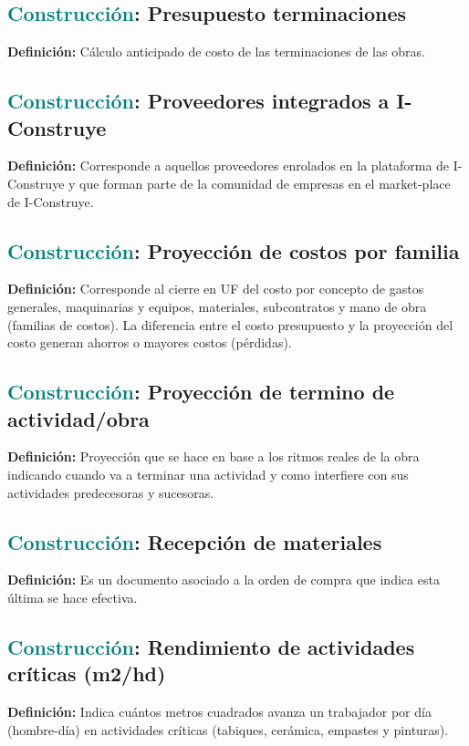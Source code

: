 \documentclass[12pt]{article}
\begin{document}
\subsection{\textcolor{teal}{Construcción}: Presupuesto terminaciones}
\textbf{Definición:} Cálculo anticipado de costo de las terminaciones de las obras.
\subsection{\textcolor{teal}{Construcción}: Proveedores integrados a I-Construye}
\textbf{Definición:} Corresponde a aquellos proveedores enrolados en la plataforma de I-Construye y que forman parte de la comunidad de empresas en el market-place de I-Construye.
\subsection{\textcolor{teal}{Construcción}: Proyección de costos por familia}
\textbf{Definición:} Corresponde al cierre en UF del costo por concepto de gastos generales, maquinarias y equipos, materiales, subcontratos y mano de obra (familias de costos). La diferencia entre el costo presupuesto y la proyección del costo generan ahorros o mayores costos (pérdidas).
\subsection{\textcolor{teal}{Construcción}: Proyección de termino de actividad/obra}
\textbf{Definición:} Proyección que se hace en base a los ritmos reales de la obra indicando cuando va a terminar una actividad y como interfiere con sus actividades predecesoras y sucesoras.
\subsection{\textcolor{teal}{Construcción}: Recepción de materiales}
\textbf{Definición:} Es un documento asociado a la orden de compra que indica esta última se hace efectiva.
\subsection{\textcolor{teal}{Construcción}: Rendimiento de actividades críticas (m2/hd)}
\textbf{Definición:} Indica cuántos metros cuadrados avanza un trabajador por día (hombre-día) en actividades críticas (tabiques, cerámica, empastes y pinturas).
\end{document}
